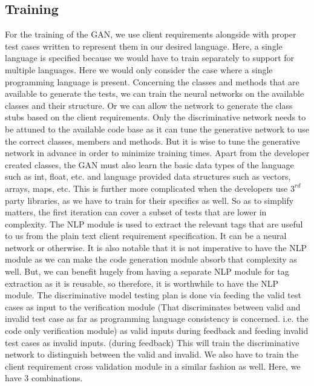 \documentclass[conference]{IEEEtran}
\begin{document}
\subsection{Training}
For the training of the GAN, we use client requirements alongside with proper test cases written to represent them in our desired language. Here, a single language is specified because we would have to train separately to support for multiple languages. Here we would only consider the case where a single programming language is present.\newline
Concerning the classes and methods that are available to generate the tests, we can train the neural networks on the available classes and their structure. Or we can allow the network to generate the class stubs based on the client requirements. Only the discriminative network needs to be attuned to the available code base as it can tune the generative network to use the correct classes, members and methods. But it is wise to tune the generative network in advance in order to minimize training times. Apart from the developer created classes, the GAN must also learn the basic data types of the language such as int, float, etc. and language provided data structures such as vectors, arrays, maps, etc. This is further more complicated when the developers use $3^{rd}$ party libraries, as we have to train for their specifics as well. So as to simplify matters, the first iteration can cover a subset of tests that are lower in complexity. The NLP module is used to extract the relevant tags that are useful to us from the plain text client requirement specification. It can be a neural network or otherwise. It is also notable that it is not imperative to have the NLP module as we can make the code generation module absorb that complexity as well. But, we can benefit hugely from having a separate NLP module for tag extraction as it is reusable, so therefore, it is worthwhile to have the NLP module.\newline
The discriminative model testing plan is done via feeding the valid test cases as input to the verification module (That discriminates between valid and invalid test case as far as programming language consistency is concerned. i.e. the code only verification module) as valid inputs during feedback and feeding invalid test cases as invalid inputs. (during feedback) This will train the discriminative network to distinguish between the valid and invalid. We also have to train the client requirement cross validation module in a similar fashion as well. Here, we have 3 combinations.
\end{document}
